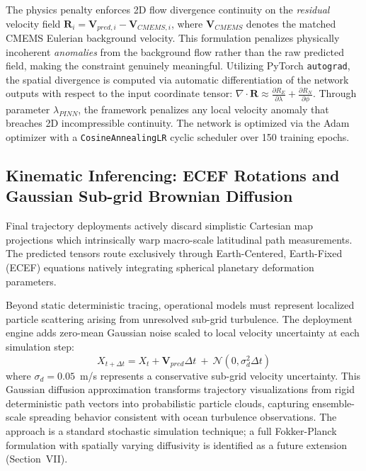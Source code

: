 \documentclass[conference]{IEEEtran}
\begin{document}
The physics penalty enforces 2D flow divergence continuity on the \textit{residual} velocity field $\mathbf{R}_i = \mathbf{V}_{pred,i} - \mathbf{V}_{CMEMS,i}$, where $\mathbf{V}_{CMEMS}$ denotes the matched CMEMS Eulerian background velocity. This formulation penalizes physically incoherent \textit{anomalies} from the background flow rather than the raw predicted field, making the constraint genuinely meaningful. Utilizing PyTorch \texttt{autograd}, the spatial divergence is computed via automatic differentiation of the network outputs with respect to the input coordinate tensor: $\nabla \cdot \mathbf{R} \approx \frac{\partial R_E}{\partial \lambda} + \frac{\partial R_N}{\partial \phi}$. Through parameter $\lambda_{PINN}$, the framework penalizes any local velocity anomaly that breaches 2D incompressible continuity. The network is optimized via the Adam optimizer with a \texttt{CosineAnnealingLR} cyclic scheduler over 150 training epochs.

\subsection{Kinematic Inferencing: ECEF Rotations and Gaussian Sub-grid Brownian Diffusion}
Final trajectory deployments actively discard simplistic Cartesian map projections which intrinsically warp macro-scale latitudinal path measurements. The predicted tensors route exclusively through Earth-Centered, Earth-Fixed (ECEF) equations natively integrating spherical planetary deformation parameters.

Beyond static deterministic tracing, operational models must represent localized particle scattering arising from unresolved sub-grid turbulence. The deployment engine adds zero-mean Gaussian noise scaled to local velocity uncertainty at each simulation step:
\begin{equation}
    X_{t+\Delta t} = X_t + \mathbf{V}_{pred} \Delta t \ + \ \mathcal{N}(0, \sigma_d^2 \Delta t)
\end{equation}
where $\sigma_d = 0.05$~m/s represents a conservative sub-grid velocity uncertainty. This Gaussian diffusion approximation transforms trajectory visualizations from rigid deterministic path vectors into probabilistic particle clouds, capturing ensemble-scale spreading behavior consistent with ocean turbulence observations. The approach is a standard stochastic simulation technique; a full Fokker-Planck formulation with spatially varying diffusivity is identified as a future extension (Section~VII).
\end{document}
